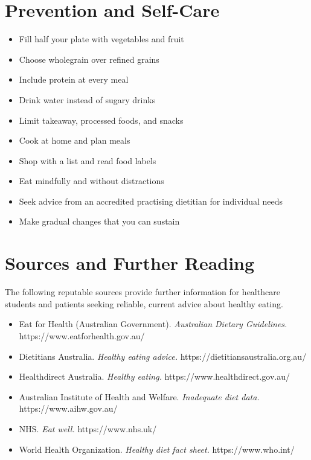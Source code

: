 \section*{Prevention and Self-Care}
\begin{itemize}
    \item Fill half your plate with vegetables and fruit
    \item Choose wholegrain over refined grains
    \item Include protein at every meal
    \item Drink water instead of sugary drinks
    \item Limit takeaway, processed foods, and snacks
    \item Cook at home and plan meals
    \item Shop with a list and read food labels
    \item Eat mindfully and without distractions
    \item Seek advice from an accredited practising dietitian for individual needs
    \item Make gradual changes that you can sustain
\end{itemize}

\section*{Sources and Further Reading}
The following reputable sources provide further information for healthcare students and patients seeking reliable, current advice about healthy eating.

\begin{itemize}
    \item Eat for Health (Australian Government). \textit{Australian Dietary Guidelines.} https://www.eatforhealth.gov.au/
    \item Dietitians Australia. \textit{Healthy eating advice.} https://dietitiansaustralia.org.au/
    \item Healthdirect Australia. \textit{Healthy eating.} https://www.healthdirect.gov.au/
    \item Australian Institute of Health and Welfare. \textit{Inadequate diet data.} https://www.aihw.gov.au/
    \item NHS. \textit{Eat well.} https://www.nhs.uk/
    \item World Health Organization. \textit{Healthy diet fact sheet.} https://www.who.int/
\end{itemize}
